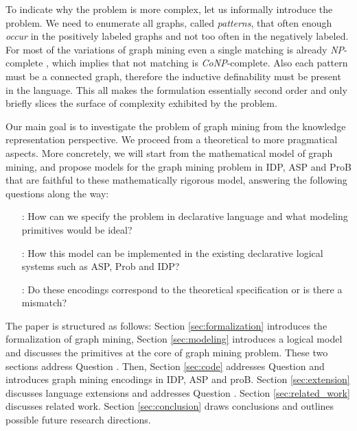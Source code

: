 To indicate why the problem is more complex, let us informally introduce the problem. We need to enumerate all graphs, called \textit{patterns}, that often enough \textit{occur} in the positively labeled graphs and not too often in the negatively labeled. For most of the variations of graph mining even a single matching is already \textit{NP}-complete \citep{subtree_overview}, which implies that not matching is \textit{CoNP}-complete.  Also each pattern must be a connected graph, therefore the inductive definability must be present in the language. This all makes the formulation essentially second order and only briefly slices the surface of complexity exhibited by the problem.

Our main goal is to investigate the problem of graph mining from the knowledge representation perspective. We proceed from a theoretical to more pragmatical aspects. More concretely, we will start from the mathematical model of graph mining, and propose models for the graph mining problem in IDP, ASP and ProB that are faithful to these mathematically rigorous model, answering the following questions along the way:
\begin{itemize}
  \item[\Qone:]  How can we specify the problem in declarative language and what modeling primitives would be ideal?
  \item[\Qtwo:]  How this model can be implemented in the existing declarative logical systems such as ASP, Prob and IDP?
  \item[\Qthree:] Do these encodings correspond to the theoretical specification or is there a mismatch?
\end{itemize}

The paper is structured as follows: Section \ref{sec:formalization} introduces the formalization of graph mining, Section \ref{sec:modeling} introduces a logical model and discusses the primitives at the core of graph mining problem. These two sections address Question \Qone. Then, Section \ref{sec:code} addresses Question \Qtwo and introduces graph mining encodings in IDP, ASP and proB. Section \ref{sec:extension} discusses language extensions and addresses Question \Qthree. Section \ref{sec:related_work} discusses related work. Section \ref{sec:conclusion} draws conclusions and outlines possible future research directions.
